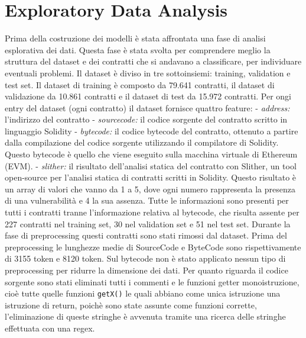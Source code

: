 \documentclass[../../Thesis.tex]{subfiles}
\begin{document}
\section{Exploratory Data Analysis}
Prima della costruzione dei modelli è stata affrontata una fase di analisi esplorativa dei dati. Questa fase è stata svolta per comprendere meglio la struttura del dataset e dei contratti che si andavano a classificare, per individuare eventuali problemi. 
Il dataset è diviso in tre sottoinsiemi: training, validation e test set.
Il dataset di training è composto da 79.641 contratti, il dataset di validazione da 10.861 contratti e il dataset di test da 15.972 contratti.
Per ongi entry del dataset (ogni contratto) il dataset fornisce quattro feature:
- \emph{address:} l'indirizzo del contratto 
- \emph{sourcecode:} il codice sorgente del contratto scritto in linguaggio Solidity
- \emph{bytecode:} il codice bytecode del contratto, ottenuto a partire dalla compilazione del codice sorgente utilizzando il compilatore di Solidity. Questo bytecode è quello che viene eseguito sulla macchina virtuale di Ethereum (EVM). 
- \emph{slither:} il risultato dell'analisi statica del contratto con Slither, un tool open-source per l'analisi statica di contratti scritti in Solidity. Questo risultato è un array di valori che vanno da 1 a 5, dove ogni numero  rappresenta la presenza di una vulnerabilità e 4 la sua assenza.
Tutte le informazioni sono presenti per tutti i contratti tranne l'informazione relativa al bytecode, che risulta assente per 227 contratti nel training set, 30 nel validation set e 51 nel test set. Durante la fase di preprocessing questi contratti sono stati rimossi dal dataset. 
Prima del preprocessing le lunghezze medie di SourceCode e ByteCode sono rispettivamente di 3155 token e 8120 token. Sul bytecode non è stato applicato nessun tipo di preprocessing per ridurre la dimensione dei dati. Per quanto riguarda il codice sorgente sono stati eliminati tutti i commenti e le funzioni getter monoistruzione, cioè tutte quelle funzioni \texttt{getX()} le quali abbiano come unica istruzione una istruzione di return, poichè sono state assunte come funzioni corrette, l'eliminazione di queste stringhe è avvenuta tramite una ricerca delle stringhe effettuata con una regex.
\end{document}
